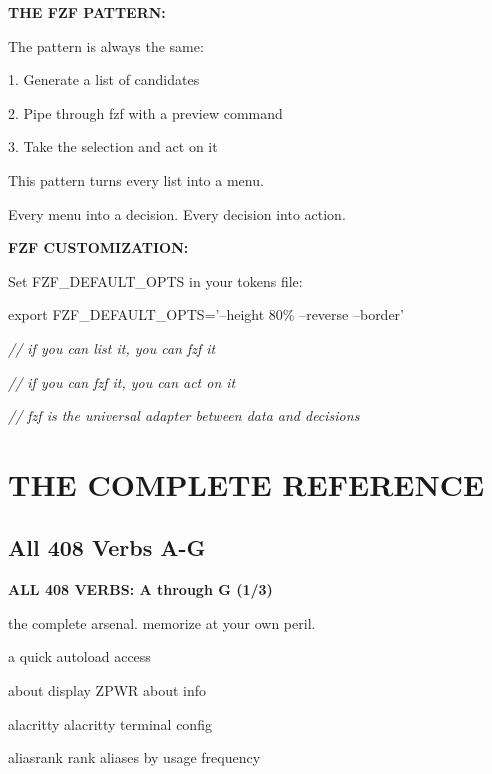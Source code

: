 \documentclass[11pt,a4paper,twoside]{book}
\begin{document}
\vspace{12pt}
{\bfseries\color{neonyellow} THE FZF PATTERN:}\vspace{4pt}

The pattern is always the same:

1. Generate a list of candidates

2. Pipe through fzf with a preview command

3. Take the selection and act on it

This pattern turns every list into a menu.

Every menu into a decision. Every decision into action.


\vspace{12pt}
{\bfseries\color{neonyellow} FZF CUSTOMIZATION:}\vspace{4pt}

Set FZF\_DEFAULT\_OPTS in your tokens file:

export FZF\_DEFAULT\_OPTS='--height 80\% --reverse --border'

{\small\itshape\color{dimtext} // if you can list it, you can fzf it}

{\small\itshape\color{dimtext} // if you can fzf it, you can act on it}

{\small\itshape\color{dimtext} // fzf is the universal adapter between data and decisions}


\vspace{16pt}


\chapter{THE COMPLETE REFERENCE}

\section{All 408 Verbs A-G}


\vspace{10pt}
{\large\bfseries\color{neoncyan} ALL 408 VERBS: A through G (1/3)}\vspace{6pt}

the complete arsenal. memorize at your own peril.

a                          quick autoload access

about                      display ZPWR about info

alacritty                  alacritty terminal config

aliasrank                  rank aliases by usage frequency
\end{document}
